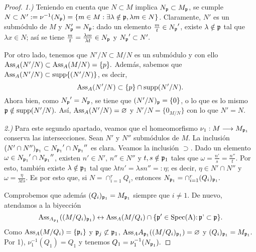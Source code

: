 \documentclass[../main.tex]{subfiles}
\begin{document}
\begin{proof}
\textit{1.)} Teniendo en cuenta que $N\subset M$ implica $N_{\mathfrak{p}}\subset M_{\mathfrak{p}}$, se cumple $N\subset N':=\nu^{-1}(N_{\mathfrak{p}})=\{m\in M:\exists\lambda\notin\mathfrak{p}, \lambda m\in N\}$. Claramente, $N'$ es un submódulo de $M$ y $N_{\mathfrak{p}}'=N_{\mathfrak{p}}$: dado un elemento $\frac{m}{t}\in {N_{\mathfrak{p}}}'$, existe $\lambda\notin\mathfrak{p}$ tal que $\lambda x\in N$; así se tiene $\frac{m}{t}=\frac{\lambda m}{\lambda t}\in N_{\mathfrak{p}}$ y ${N_{\mathfrak{p}}}'\subset N'.$

Por otro lado, tenemos que $N'/N\subset M/N$ es un submódulo y con ello $\text{Ass}_A(N'/N)\subset\text{Ass}_A(M/N)=\{p\}.$ Además, sabemos que $\text{Ass}_A(N'/N)\subset\operatorname{supp}\{(N'/N)\}$, es decir,
$$\text{Ass}_A(N'/N)\subset\{p\}\cap\operatorname{supp}(N'/N).$$
Ahora bien, como ${N_{\mathfrak{p}}}'=N_{\mathfrak{p}}$, se tiene que $(N'/N)_{\mathfrak{p}}=\{0\}$, o lo que es lo mismo $\mathfrak{p}\notin\operatorname{supp}(N'/N).$ Así, $\text{Ass}_A(N'/N)=\varnothing$ y $N'/N=\{0_{M/N}\}$ con lo que $N'=N.$

\textit{2.)} Para este segundo apartado, veamos que el homeomorfismo $\nu_1:M\longrightarrow M_{\mathfrak{p}_1}$ conserva las intersecciones. Sean $N'$ y $N''$ submódulos de $M$. La inclusión $(N'\cap N'')_{\mathfrak{p}_1}\subset {N_{\mathfrak{p}_1}}'\cap{N_{\mathfrak{p}_1}}''$ es clara. Veamos la inclusión $\supset.$ Dado un elemento $\omega\in {N_{\mathfrak{p}_1}}'\cap{N_{\mathfrak{p}_1}}''$, existen $n'\in N'$, $n''\in N''$ y $t,s\notin\mathfrak{p}_1$ tales que $\omega=\frac{n'}{s}=\frac{n''}{t}.$ Por esto, también existe $\lambda\notin\mathfrak{p}_1$ tal que $\lambda tn'=\lambda sn''=:\eta$; es decir, $\eta\in N'\cap N''$ y $\omega=\frac{\eta}{\lambda ts}.$ Es por esto que, si $N=\cap_{i=1}^r Q_i$, entonces $N_{\mathfrak{p}_1}=\cap_{i=1}^r(Q_i)_{\mathfrak{p}_1}.$

Comprobemos que además $(Q_i)_{\mathfrak{p}_1}=M_{\mathfrak{p}_1}$ siempre que $i\neq 1.$ De nuevo, atendamos a la biyección
$$\text{Ass}_{A_{\mathfrak{p}_1}}((M/Q_i)_{\mathfrak{p}_1})\leftrightarrow\text{Ass}_A(M/Q_i)\cap\{\mathfrak{p}'\in\operatorname{Spec(A):\mathfrak{p}'\subset\mathfrak{p}}\}.$$
Como $\text{Ass}_A(M/Q_i)=\{\mathfrak{p}_i\}$ y $\mathfrak{p}_j\not\subset\mathfrak{p}_1$, $\text{Ass}_A{A_{\mathfrak{p}_1}}((M/Q_i)_{\mathfrak{p}_1})=\varnothing$ y $(Q_i)_{\mathfrak{p}_1}=M_{\mathfrak{p}_1}.$ Por 1), $\nu_1^{-1}(Q_1)=Q_1$ y tenemos $Q_1=\nu_1^{-1}(N_{\mathfrak{p}_1}).$
\end{proof}
\end{document}
